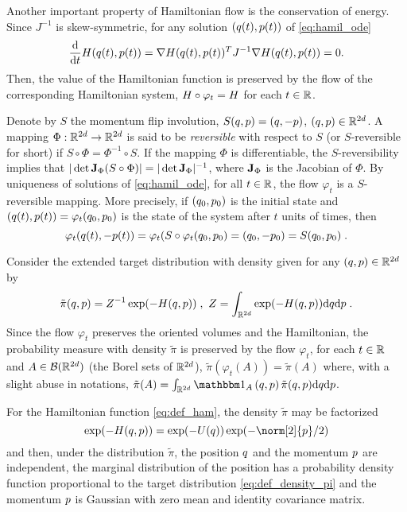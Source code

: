 Another important property of Hamiltonian flow is the conservation of energy.
Since $J^{-1}$ is skew-symmetric, for any solution $(q(t),p(t))$ of \eqref{eq:hamil_ode}
\[
\frac{\mathrm{d} }{\mathrm{d} t} H(q(t),p(t)) =\nabla H(q(t),p(t))^T J^{-1} \nabla H(q(t),p(t))= 0.
\]
Then, the value of the Hamiltonian function is preserved by the flow of the corresponding Hamiltonian system, $H \circ \varphi_t= H$ for each $t \in \mathbb{R}$.


Denote by $S$ the momentum flip involution, $S(q,p)= (q,-p)$, $(q,p) \in \mathbb{R}^{2d}$. A mapping $\Phi: \mathbb{R}^{2d} \to \mathbb{R}^{2d}$ is said to be \emph{reversible} with respect to $S$ (or $S$-reversible for short) if $ S \circ \Phi= \Phi^{-1} \circ S$. If the mapping $\Phi$ is differentiable, the $S$-reversibility implies that $|\operatorname{det} \mathbf{J}_{\Phi} (S \circ \Phi)|= |\operatorname{det} \mathbf{J}_{\Phi}|^{-1}$, where $\mathbf{J}_{\Phi}$ is the Jacobian of $\Phi$.
By uniqueness of solutions of
\eqref{eq:hamil_ode}, for all $t \in \mathbb{R}$, the flow $\varphi_t$ is  a
$S$-reversible mapping. More precisely, if $(q_0,p_0)$ is the initial state and
$(q(t),p(t))= \varphi_t(q_0,p_0)$ is the state of the system after
$t$ units of times, then
\[
\varphi_t(q(t),-p(t))= \varphi_t( S \circ \varphi_t(q_0,p_0)= (q_0,-p_0)=S (q_0,p_0) \;.
\]


Consider the extended target distribution with density given for any $(q,p) \in \mathbb{R}^{2d}$ by 
\begin{equation}
\label{eq:def_ext_pi}
 \tilde{\pi}(q,p) = Z^{-1}
\exp(-H(q,p)) \;,   \, \, Z= \int_{\mathbb{R}^{2d}} \exp(-H(q,p)) \mathrm{d} q \mathrm{d} p \;.
\end{equation}
Since the flow $\varphi_t$ preserves the oriented volumes and the Hamiltonian, the probability measure with density $\tilde{\pi}$ is preserved by the flow $\varphi_t$, for each $t \in \mathbb{R}$ and $A \in \mathcal{B}(\mathbb{R}^{2d})$ (the Borel sets of $\mathbb{R}^{2d}$), $\tilde{\pi}(\varphi_t(A))= \tilde{\pi}(A)$ where, with a slight abuse in notations,
$\tilde{\pi}(A)= \int_{\rset^{2d}} \indi{A}{q,\p} \tilde{\pi}(\q,\p) \rmd\q \rmd \p$.

For the Hamiltonian function \eqref{eq:def_ham}, the density $\tilde{\pi}$ may be factorized
\[
\exp(-\Ham(\q,\p)) = \exp(-\F(\q)) \exp(- \norm[2]{\p}/2)
\]
and then, under the distribution $\tilde{\pi}$, the position $q$ and the momentum $p$ are independent,
the marginal distribution of the position has a probability density function proportional to the target distribution \eqref{eq:def_density_pi} and the momentum $p$ is Gaussian with zero mean and identity covariance matrix.



